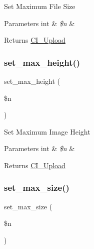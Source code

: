 Set Maximum File Size


\begin{DoxyParams}[1]{Parameters}
int & {\em \$n} & \\
\hline
\end{DoxyParams}
\begin{DoxyReturn}{Returns}
\mbox{\hyperlink{class_c_i___upload}{C\+I\+\_\+\+Upload}} 
\end{DoxyReturn}
\mbox{\label{class_c_i___upload_aaed82d431f5aeee6a0af294bc604a51e}} 
\subsubsection{\texorpdfstring{set\+\_\+max\+\_\+height()}{set\_max\_height()}}
{\footnotesize\ttfamily set\+\_\+max\+\_\+height (\begin{DoxyParamCaption}\item[{}]{\$n }\end{DoxyParamCaption})}

Set Maximum Image Height


\begin{DoxyParams}[1]{Parameters}
int & {\em \$n} & \\
\hline
\end{DoxyParams}
\begin{DoxyReturn}{Returns}
\mbox{\hyperlink{class_c_i___upload}{C\+I\+\_\+\+Upload}} 
\end{DoxyReturn}
\mbox{\label{class_c_i___upload_ac6e7445ece6780c730e910d978dde95e}} 
\subsubsection{\texorpdfstring{set\+\_\+max\+\_\+size()}{set\_max\_size()}}
{\footnotesize\ttfamily set\+\_\+max\+\_\+size (\begin{DoxyParamCaption}\item[{}]{\$n }\end{DoxyParamCaption})\hspace{0.3cm}{\ttfamily [protected]}}


